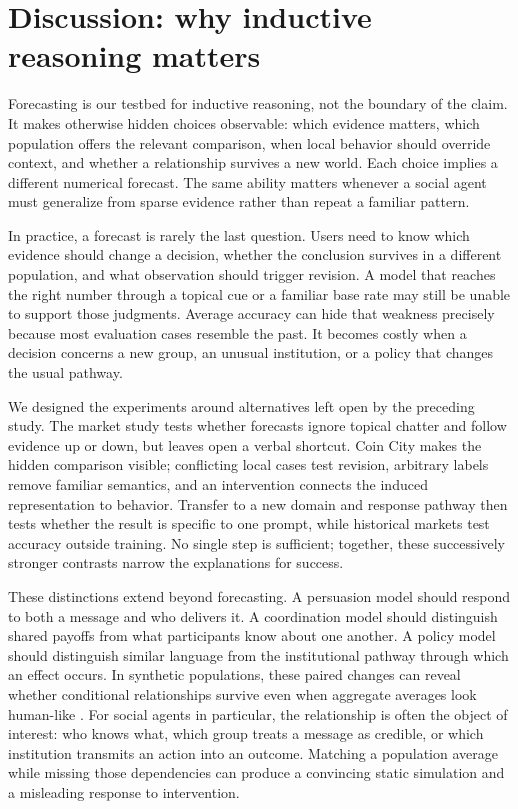 \section{Discussion: why inductive reasoning matters}
\label{sec:discussion}

Forecasting is our testbed for inductive reasoning, not the boundary of the
claim. It makes otherwise hidden choices observable: which evidence matters,
which population offers the relevant comparison, when local behavior should
override context, and whether a relationship survives a new world. Each choice
implies a different numerical forecast. The same ability matters whenever a
social agent must generalize from sparse evidence rather than repeat a familiar
pattern.

In practice, a forecast is rarely the last question. Users need to know which
evidence should change a decision, whether the conclusion survives in a different
population, and what observation should trigger revision. A model that reaches
the right number through a topical cue or a familiar base rate may still be
unable to support those judgments. Average
accuracy can hide that weakness precisely because most evaluation cases resemble
the past. It becomes costly when a decision concerns a new group, an unusual
institution, or a policy that changes the usual pathway.

We designed the experiments around alternatives left open by the preceding
study. The market study tests whether forecasts ignore topical chatter and follow
evidence up or down, but leaves open a verbal shortcut. Coin City makes the hidden
comparison visible; conflicting local cases test revision, arbitrary labels
remove familiar semantics, and an intervention connects the induced
representation to behavior. Transfer to a new domain and response pathway then
tests whether the result is specific to one prompt, while historical markets test
accuracy outside training. No single step is sufficient; together, these
successively stronger contrasts narrow the explanations for success.

These distinctions extend beyond forecasting. A persuasion model should respond to
both a message and who delivers it. A coordination model should distinguish
shared payoffs from what participants know about one another. A policy model
should distinguish similar language from the institutional pathway through which
an effect occurs. In synthetic populations, these paired changes can reveal
whether conditional relationships survive even when aggregate averages look
human-like
\citep{park2023generative,aher2023simulate,argyle2023out,bisbee2024synthetic}.
For social agents in particular, the relationship is often the object of
interest: who knows what, which group treats a message as credible, or which
institution transmits an action into an outcome. Matching a population average
while missing those dependencies can produce a convincing static simulation and
a misleading response to intervention.


